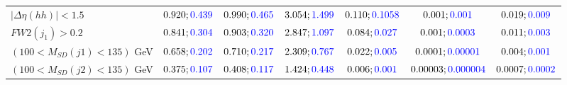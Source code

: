 \begin{landscape}
\begin{table}
\begin{tabular}{lcccccc}
				\rowcolor{black!7}$|\Delta\eta(hh)|<1.5$& $0.920;\textcolor{blue}{0.439}$&$0.990;\textcolor{blue}{0.465}$ &$3.054;\textcolor{blue}{1.499}$ &$0.110;\textcolor{blue}{0.1058}$ &$0.001;\textcolor{blue}{0.001}$ &$0.019;\textcolor{blue}{0.009}$\\
				$FW2(j_1)>0.2$ &$0.841;\textcolor{blue}{0.304}$ &$0.903;\textcolor{blue}{0.320}$&$2.847;\textcolor{blue}{1.097}$&$0.084;\textcolor{blue}{0.027}$&$0.001;\textcolor{blue}{0.0003}$&$0.011;\textcolor{blue}{0.003}$\\
				\rowcolor{black!7}$(100<M_{SD}(j1)<135)$ GeV& $0.658;\textcolor{blue}{0.202}$&$0.710;\textcolor{blue}{0.217}$&$2.309;\textcolor{blue}{0.767}$&$0.022;\textcolor{blue}{0.005}$&$0.0001;\textcolor{blue}{0.00001}$&$0.004;\textcolor{blue}{0.001}$\\
				$(100<M_{SD}(j2)<135)$ GeV &$0.375;\textcolor{blue}{0.107}$ &$0.408;\textcolor{blue}{0.117}$ &$1.424;\textcolor{blue}{0.448}$&$0.006;\textcolor{blue}{0.001}$&$0.00003;\textcolor{blue}{0.000004}$&$0.0007;\textcolor{blue}{0.0002}$\\
				\bottomrule
			\end{tabular}
		\end{table}
		

\end{landscape}
